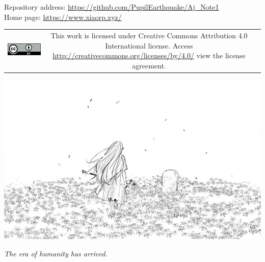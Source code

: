 \pagestyle{empty}%



\clearpage %
\vspace*{5em}

\begin{center}
    Repository address: \url{https://github.com/PupilEarthquake/Aj_Note1} \\
    Home page: \url{https://www.xiaorp.xyz/} \\
\end{center}

\vfill

\begin{tabular*}{\textwidth}{ccc}
    \includegraphics{config/ccby.png}
    & \begin{minipage}[b]{0.6\textwidth}
        \small This work is licensed under Creative Commons Attribution 4.0 International license. Access \url{http://creativecommons.org/licenses/by/4.0/} view the license agreement.
    \end{minipage}
\end{tabular*}
\cleardoublepage


\vspace*{10em}
\includegraphics[width=\textwidth]{config/frieren.png}
\begin{center}
    \textit{The era of humanity has arrived.}
\end{center}

\cleardoublepage

\pagestyle{fancy}		%

\setcounter{page}{1}
\thispagestyle{empty}

\tableofcontents